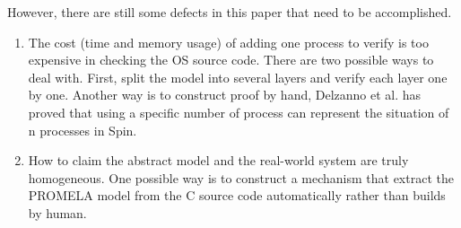 However, there are still some defects in this paper that need to be accomplished.

\begin{enumerate}
\item The cost (time and memory usage) of adding one process to verify is too expensive in checking the OS source code. There are two possible ways to deal with. First, split the model into several layers and verify each layer one by one. Another way is to construct proof by hand, Delzanno et al. \cite{EPTCS161.13} has proved that using a specific number of process can represent the situation of n processes in Spin.
\item How to claim the abstract model and the real-world system are truly homogeneous. One possible way is to construct a mechanism that extract the PROMELA model from the C source code automatically rather than builds by human.
\end{enumerate}
